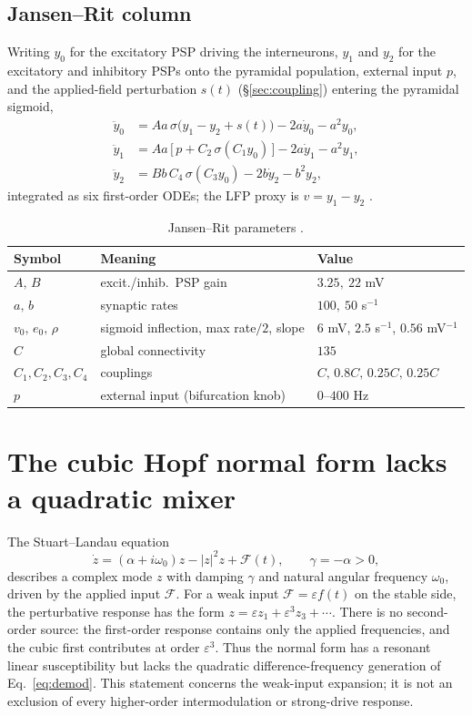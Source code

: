 \documentclass[11pt,a4paper]{article}
\newcommand{\Sig}{\sigma}
\begin{document}
\subsection*{Jansen--Rit column}
Writing $y_0$ for the excitatory PSP driving the interneurons, $y_1$ and $y_2$ for the
excitatory and inhibitory PSPs onto the pyramidal population, external input $p$, and the
applied-field perturbation $s(t)$ (\S\ref{sec:coupling}) entering the pyramidal sigmoid,
\begin{align}
\ddot y_0 &= Aa\,\Sig\!\big(y_1-y_2+s(t)\big)-2a\dot y_0-a^2 y_0, \label{eq:jr0}\\
\ddot y_1 &= Aa\,\big[\,p+C_2\,\Sig(C_1 y_0)\,\big]-2a\dot y_1-a^2 y_1,\\
\ddot y_2 &= Bb\,C_4\,\Sig(C_3 y_0)-2b\dot y_2-b^2 y_2,
\end{align}
integrated as six first-order ODEs; the LFP proxy is $v=y_1-y_2$ \cite{jansen1995}.

\begin{table}[h]\centering\small
\caption{Jansen--Rit parameters \cite{jansen1995}.}
\label{tab:params}
\begin{tabular}{@{}lll@{}}
\toprule
Symbol & Meaning & Value\\
\midrule
$A,\,B$ & excit./inhib.\ PSP gain & $3.25,\ 22$ mV\\
$a,\,b$ & synaptic rates & $100,\ 50$ s$^{-1}$\\
$v_0,\,e_0,\,\rho$ & sigmoid inflection, max rate$/2$, slope & $6$ mV, $2.5$ s$^{-1}$, $0.56$ mV$^{-1}$\\
$C$ & global connectivity & $135$\\
$C_1,C_2,C_3,C_4$ & couplings & $C,\,0.8C,\,0.25C,\,0.25C$\\
$p$ & external input (bifurcation knob) & $0$--$400$ Hz\\
\bottomrule
\end{tabular}
\end{table}

\section{The cubic Hopf normal form lacks a quadratic mixer}\label{app:sl}
The Stuart--Landau equation \cite{pikovsky2001}
\begin{equation}
\dot z=(\alpha+i\omega_0)z-|z|^2z+\mathcal F(t),\qquad
\gamma=-\alpha>0,
\label{eq:sl}
\end{equation}
describes a complex mode $z$ with damping $\gamma$ and natural angular frequency
$\omega_0$, driven by the applied input $\mathcal F$. For a weak input
$\mathcal F=\varepsilon f(t)$ on the stable side, the perturbative response has
the form $z=\varepsilon z_1+\varepsilon^3z_3+\cdots$. There is no second-order
source: the first-order response contains only the applied frequencies, and the
cubic first contributes at order $\varepsilon^3$. Thus the normal form has a
resonant linear susceptibility but lacks the quadratic difference-frequency
generation of Eq.~\eqref{eq:demod}. This statement concerns the weak-input
expansion; it is not an exclusion of every higher-order intermodulation or
strong-drive response.
\end{document}
